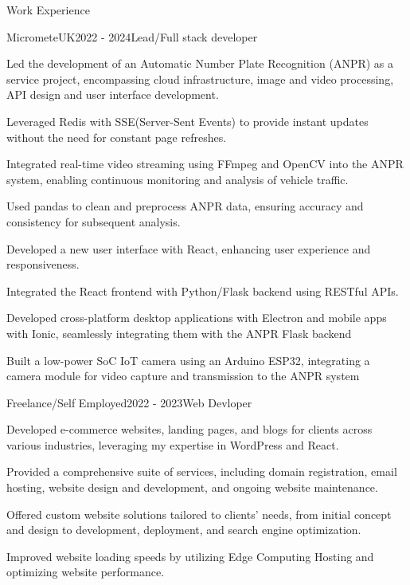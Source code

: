 \documentclass{resume}
\begin{document}
\begin{rSection}{Work Experience}
\begin{rSubsection}{MicrometeUK}{2022 -  2024}{Lead/Full stack developer}

\item Led the development of an Automatic Number Plate Recognition (ANPR) as a service project, encompassing  cloud infrastructure, image and video  processing, API design and  user interface development.
\item Leveraged Redis  with SSE(Server-Sent Events) to provide instant updates without  the need for constant page refreshes.
\item Integrated real-time video streaming using FFmpeg and OpenCV into the ANPR system, enabling continuous monitoring and analysis of vehicle traffic.
\item Used pandas to clean and preprocess ANPR data, ensuring accuracy and consistency for subsequent analysis.
\item Developed a new user interface with React, enhancing user experience and responsiveness.
\item Integrated the React frontend with  Python/Flask backend using RESTful APIs.
\item Developed cross-platform desktop applications with Electron and mobile apps with Ionic, seamlessly integrating them with the ANPR Flask backend
\item Built a low-power SoC IoT camera using an  Arduino ESP32, integrating a camera module for video capture and transmission to the ANPR system
\end{rSubsection}
\begin{rSubsection}{Freelance/Self Employed}{2022 - 2023}{Web Devloper }{}
\item Developed e-commerce websites, landing pages, and blogs for clients across various industries, leveraging my expertise in  WordPress and React.
\item Provided a comprehensive suite of services, including domain registration, email hosting, website design and development, and ongoing website maintenance.
\item Offered custom website solutions tailored to clients' needs, from initial concept and design to development, deployment, and search engine optimization.
\item Improved website loading speeds  by utilizing Edge Computing Hosting and optimizing website performance.

\end{rSubsection}
\end{rSection}
\end{document}

